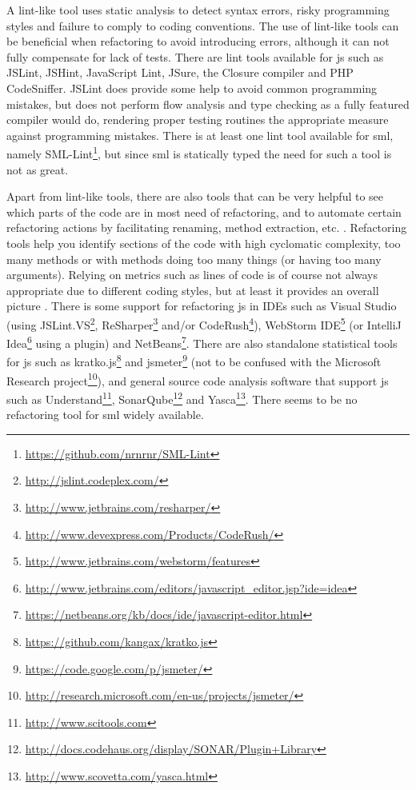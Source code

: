 \documentclass[11pt]{article}
\begin{document}
A lint-like tool uses static analysis to detect syntax errors, risky programming styles and failure to comply to coding conventions. The use of lint-like tools can be beneficial when refactoring to avoid introducing errors, although it can not fully compensate for lack of tests. There are lint tools available for \gls{js} such as JSLint, JSHint, JavaScript Lint, JSure, the Closure compiler and PHP CodeSniffer. JSLint does provide some help to avoid common programming mistakes, but does not perform flow analysis \cite{JSLint} and type checking as a fully featured compiler would do, rendering proper testing routines the appropriate measure against programming mistakes. There is at least one lint tool available for \gls{sml}, namely SML-Lint\footnote{\url{https://github.com/nrnrnr/SML-Lint}}, but since \gls{sml} is statically typed the need for such a tool is not as great.

Apart from lint-like tools, there are also tools that can be very helpful to see which parts of the code are in most need of refactoring, and to automate certain refactoring actions by facilitating renaming, method extraction, etc. \cite[ch.~5]{Legacy}. Refactoring tools help you identify sections of the code with high cyclomatic complexity, too many methods or with methods doing too many things (or having too many arguments). Relying on metrics such as lines of code is of course not always appropriate due to different coding styles, but at least it provides an overall picture \cite{Kratko}. There is some support for refactoring \gls{js} in IDEs such as Visual Studio (using
JSLint.VS\footnote{\url{http://jslint.codeplex.com/}},
ReSharper\footnote{\url{http://www.jetbrains.com/resharper/}} and/or
CodeRush\footnote{\url{http://www.devexpress.com/Products/CodeRush/}}),
WebStorm IDE\footnote{\url{http://www.jetbrains.com/webstorm/features}} (or
IntelliJ Idea\footnote{\url{http://www.jetbrains.com/editors/javascript_editor.jsp?ide=idea}} using a plugin) and
NetBeans\footnote{\url{https://netbeans.org/kb/docs/ide/javascript-editor.html}}. There are also standalone statistical tools for \gls{js} such as
kratko.js\footnote{\url{https://github.com/kangax/kratko.js}} and
jsmeter\footnote{\url{https://code.google.com/p/jsmeter/}} (not to be confused with the
Microsoft Research project\footnote{\url{http://research.microsoft.com/en-us/projects/jsmeter/}}), and general source code analysis software that support \gls{js} such as
Understand\footnote{\url{http://www.scitools.com}},
SonarQube\footnote{\url{http://docs.codehaus.org/display/SONAR/Plugin+Library}} and
Yasca\footnote{\url{http://www.scovetta.com/yasca.html}}.
There seems to be no refactoring tool for \gls{sml} widely available.
\end{document}
